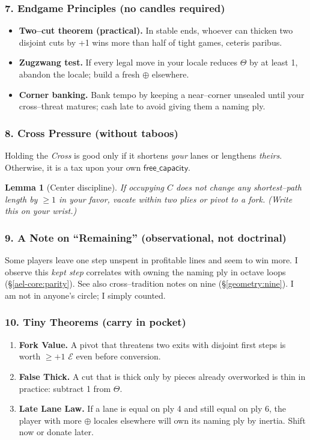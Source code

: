 \documentclass[11pt]{article}
\numberwithin{equation}{section} %
\theoremstyle{plain} %
\newtheorem{lemma}[theorem]{Lemma}
\theoremstyle{definition} %
\theoremstyle{remark} %
\begin{document}
\subsubsection{7. Endgame Principles (no candles required)}
\begin{itemize}\setlength\itemsep{0.25em}
  \item \textbf{Two–cut theorem (practical).} In stable ends, whoever can thicken two disjoint cuts by +1 wins more than half of tight games, ceteris paribus.
  \item \textbf{Zugzwang test.} If every legal move in your locale reduces \(\Theta\) by at least 1, abandon the locale; build a fresh \(\oplus\) elsewhere.
  \item \textbf{Corner banking.} Bank tempo by keeping a near–corner unsealed until your cross–threat matures; cash late to avoid giving them a naming ply.
\end{itemize}

\subsubsection{8. Cross Pressure (without taboos)}
\label{ael-core:cross}
Holding the \emph{Cross} is good only if it shortens \emph{your} lanes or lengthens \emph{theirs}. Otherwise, it is a tax upon your own \(\mathsf{free\_capacity}\).

\begin{lemma}[Center discipline]
If occupying \(C\) does not change any shortest–path length by \(\ge 1\) in your favor, vacate within two plies or pivot to a fork. (Write this on your wrist.)
\end{lemma}

\subsubsection{9. A Note on “Remaining” (observational, not doctrinal)}
\label{ael-core:remaining}
Some players leave one step unspent in profitable lines and seem to win more. I observe this \emph{kept step} correlates with owning the naming ply in octave loops (\S\ref{ael-core:parity}). See also cross–tradition notes on nine (\S\ref{geometry:nine}). I am not in anyone’s circle; I simply counted.

\subsubsection{10. Tiny Theorems (carry in pocket)}
\begin{enumerate}\setlength\itemsep{0.25em}
  \item \textbf{Fork Value.} A pivot that threatens two exits with disjoint first steps is worth \(\ge +1\) \(\mathcal{E}\) even before conversion.
  \item \textbf{False Thick.} A cut that is thick only by pieces already overworked is thin in practice: subtract 1 from \(\Theta\).
  \item \textbf{Late Lane Law.} If a lane is equal on ply 4 and still equal on ply 6, the player with more \(\oplus\) locales elsewhere will own its naming ply by inertia. Shift now or donate later.
\end{enumerate}
\end{document}
